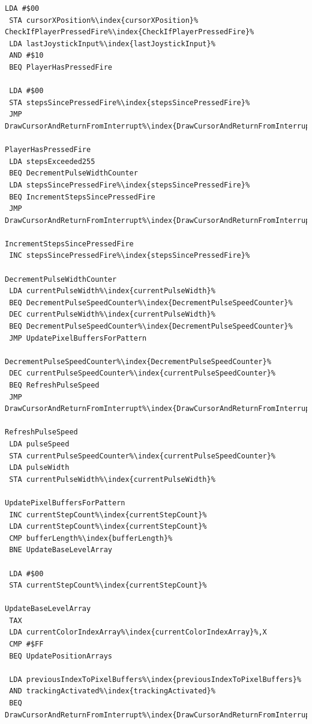 \begin{minipage}[b]{0.33\linewidth}
\begin{lrbox}{\mybox}%
\begin{lstlisting}[basicstyle=\ttfamily\tiny,escapechar=\%]
 LDA #$00
 STA cursorXPosition%\index{cursorXPosition}%
CheckIfPlayerPressedFire%\index{CheckIfPlayerPressedFire}%
 LDA lastJoystickInput%\index{lastJoystickInput}%
 AND #$10
 BEQ PlayerHasPressedFire

 LDA #$00
 STA stepsSincePressedFire%\index{stepsSincePressedFire}%
 JMP DrawCursorAndReturnFromInterrupt%\index{DrawCursorAndReturnFromInterrupt}%

PlayerHasPressedFire
 LDA stepsExceeded255
 BEQ DecrementPulseWidthCounter
 LDA stepsSincePressedFire%\index{stepsSincePressedFire}%
 BEQ IncrementStepsSincePressedFire
 JMP DrawCursorAndReturnFromInterrupt%\index{DrawCursorAndReturnFromInterrupt}%

IncrementStepsSincePressedFire
 INC stepsSincePressedFire%\index{stepsSincePressedFire}%

DecrementPulseWidthCounter
 LDA currentPulseWidth%\index{currentPulseWidth}%
 BEQ DecrementPulseSpeedCounter%\index{DecrementPulseSpeedCounter}%
 DEC currentPulseWidth%\index{currentPulseWidth}%
 BEQ DecrementPulseSpeedCounter%\index{DecrementPulseSpeedCounter}%
 JMP UpdatePixelBuffersForPattern

DecrementPulseSpeedCounter%\index{DecrementPulseSpeedCounter}%
 DEC currentPulseSpeedCounter%\index{currentPulseSpeedCounter}%
 BEQ RefreshPulseSpeed
 JMP DrawCursorAndReturnFromInterrupt%\index{DrawCursorAndReturnFromInterrupt}%

RefreshPulseSpeed
 LDA pulseSpeed
 STA currentPulseSpeedCounter%\index{currentPulseSpeedCounter}%
 LDA pulseWidth
 STA currentPulseWidth%\index{currentPulseWidth}%

UpdatePixelBuffersForPattern
 INC currentStepCount%\index{currentStepCount}%
 LDA currentStepCount%\index{currentStepCount}%
 CMP bufferLength%\index{bufferLength}%
 BNE UpdateBaseLevelArray

 LDA #$00
 STA currentStepCount%\index{currentStepCount}%

UpdateBaseLevelArray
 TAX
 LDA currentColorIndexArray%\index{currentColorIndexArray}%,X
 CMP #$FF
 BEQ UpdatePositionArrays

 LDA previousIndexToPixelBuffers%\index{previousIndexToPixelBuffers}%
 AND trackingActivated%\index{trackingActivated}%
 BEQ DrawCursorAndReturnFromInterrupt%\index{DrawCursorAndReturnFromInterrupt}%


\end{lstlisting}
\end{lrbox}
\end{minipage}
